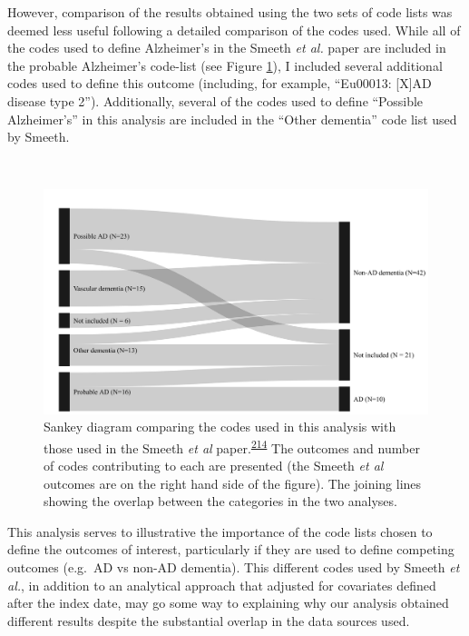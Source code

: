 \documentclass[a4paper, twoside]{templates/ociamthesis}
\begin{document}
However, comparison of the results obtained using the two sets of code lists was deemed less useful following a detailed comparison of the codes used. While all of the codes used to define Alzheimer's in the Smeeth \emph{et al.} paper are included in the probable Alzheimer's code-list (see Figure \ref{fig:smeethComparison}), I included several additional codes used to define this outcome (including, for example, ``Eu00013: {[}X{]}AD disease type 2''). Additionally, several of the codes used to define ``Possible Alzheimer's'' in this analysis are included in the ``Other dementia'' code list used by Smeeth.

~





\begin{figure}[H]
\includegraphics[width=1\linewidth]{figures/cprd-analysis/sankey_diagram} \caption[Comparison of code used in this analysis with those used in the Smeeth et al.~2010 paper]{Sankey diagram comparing the codes used in this analysis with those used in the Smeeth \emph{et al} paper.\textsuperscript{\protect\hyperlink{ref-smeeth2009}{214}} The outcomes and number of codes contributing to each are presented (the Smeeth \emph{et al} outcomes are on the right hand side of the figure). The joining lines showing the overlap between the categories in the two analyses.}\label{fig:smeethComparison}
\end{figure}

This analysis serves to illustrative the importance of the code lists chosen to define the outcomes of interest, particularly if they are used to define competing outcomes (e.g.~AD vs non-AD dementia). This different codes used by Smeeth \emph{et al.}, in addition to an analytical approach that adjusted for covariates defined after the index date, may go some way to explaining why our analysis obtained different results despite the substantial overlap in the data sources used.
\end{document}
